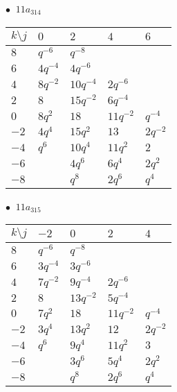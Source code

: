 \begin{minipage}{\linewidth}
$\bullet\ $ $11a_{314}$ \vspace{0.5em} \\
\begin{tabular}{l|llll}
$k \setminus j$ & $0$ & $2$ & $4$ & $6$ \\
\hline
$8$ & $q^{-6}$ & $q^{-8}$ &  &  \\
$6$ & $4q^{-4}$ & $4q^{-6}$ &  &  \\
$4$ & $8q^{-2}$ & $10q^{-4}$ & $2q^{-6}$ &  \\
$2$ & $8$ & $15q^{-2}$ & $6q^{-4}$ &  \\
$0$ & $8q^{2}$ & $18$ & $11q^{-2}$ & $q^{-4}$ \\
$-2$ & $4q^{4}$ & $15q^{2}$ & $13$ & $2q^{-2}$ \\
$-4$ & $q^{6}$ & $10q^{4}$ & $11q^{2}$ & $2$ \\
$-6$ &  & $4q^{6}$ & $6q^{4}$ & $2q^{2}$ \\
$-8$ &  & $q^{8}$ & $2q^{6}$ & $q^{4}$ \\
\end{tabular}
\vspace{2em}
\end{minipage}
%
\begin{minipage}{\linewidth}
$\bullet\ $ $11a_{315}$ \vspace{0.5em} \\
\begin{tabular}{l|llll}
$k \setminus j$ & $-2$ & $0$ & $2$ & $4$ \\
\hline
$8$ & $q^{-6}$ & $q^{-8}$ &  &  \\
$6$ & $3q^{-4}$ & $3q^{-6}$ &  &  \\
$4$ & $7q^{-2}$ & $9q^{-4}$ & $2q^{-6}$ &  \\
$2$ & $8$ & $13q^{-2}$ & $5q^{-4}$ &  \\
$0$ & $7q^{2}$ & $18$ & $11q^{-2}$ & $q^{-4}$ \\
$-2$ & $3q^{4}$ & $13q^{2}$ & $12$ & $2q^{-2}$ \\
$-4$ & $q^{6}$ & $9q^{4}$ & $11q^{2}$ & $3$ \\
$-6$ &  & $3q^{6}$ & $5q^{4}$ & $2q^{2}$ \\
$-8$ &  & $q^{8}$ & $2q^{6}$ & $q^{4}$ \\
\end{tabular}
\vspace{2em}
\end{minipage}
%

